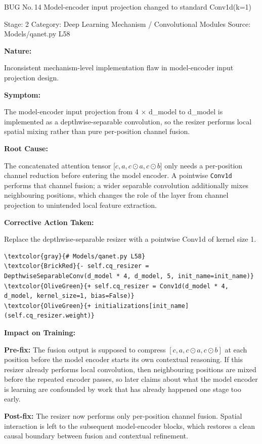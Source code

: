 \documentclass[10pt]{article}
\newcommand{\FieldLabel}[1]{%
 {\bfseries #1:}\par
}
\begin{document}
\begin{bugbox}{BUG No.\,14 \quad Model-encoder input projection changed to standard Conv1d(k=1)}
{\color{MetaGray}\small Stage: 2 \;\textbar\; Category: Deep Learning Mechanism / Convolutional Modules \;\textbar\; Source: Models/qanet.py L58\par}
\vspace{0.22em}
\FieldLabel{Nature}
Inconsistent mechanism-level implementation flaw in model-encoder input projection design.
\par
\vspace{0.35em}
\FieldLabel{Symptom}
The model-encoder input projection from 4 × d\_model to d\_model is implemented as a depthwise-separable convolution, so the resizer performs local spatial mixing rather than pure per-position channel fusion.
\par
\vspace{0.35em}
\FieldLabel{Root Cause}
The concatenated attention tensor {[}$c, a, c \odot a, c \odot b${]} only needs a per-position channel reduction before entering the model encoder. A pointwise \texttt{Conv1d} performs that channel fusion; a wider separable convolution additionally mixes neighbouring positions, which changes the role of the layer from channel projection to unintended local feature extraction.
\par
\vspace{0.35em}
\FieldLabel{Corrective Action Taken}
Replace the depthwise-separable resizer with a pointwise Conv1d of kernel size 1.
\par
\vspace{0.35em}
\begin{Verbatim}[commandchars=\\\{\},fontsize=\footnotesize,breaklines=true,breaksymbol={},frame=leftline,framerule=2pt,rulecolor=\color{gray!40},xleftmargin=6pt,formatcom=\singlespacing]
\textcolor{gray}{# Models/qanet.py L58}
\textcolor{BrickRed}{- self.cq_resizer = DepthwiseSeparableConv(d_model * 4, d_model, 5, init_name=init_name)}
\textcolor{OliveGreen}{+ self.cq_resizer = Conv1d(d_model * 4, d_model, kernel_size=1, bias=False)}
\textcolor{OliveGreen}{+ initializations[init_name](self.cq_resizer.weight)}
\end{Verbatim}
\vspace{0.22em}
\FieldLabel{Impact on Training}
\textbf{Pre-fix:} The fusion output is supposed to compress \([c, a, c\odot a, c\odot b]\) at each position before the model encoder starts its own contextual reasoning. If this resizer already performs local convolution, then neighbouring positions are mixed before the repeated encoder passes, so later claims about what the model encoder is learning are confounded by work that has already happened one stage too early.\par\smallskip
\textbf{Post-fix:} The resizer now performs only per-position channel fusion. Spatial interaction is left to the subsequent model-encoder blocks, which restores a clean causal boundary between fusion and contextual refinement.
\par
\vspace{0.35em}
\end{bugbox}
\end{document}
